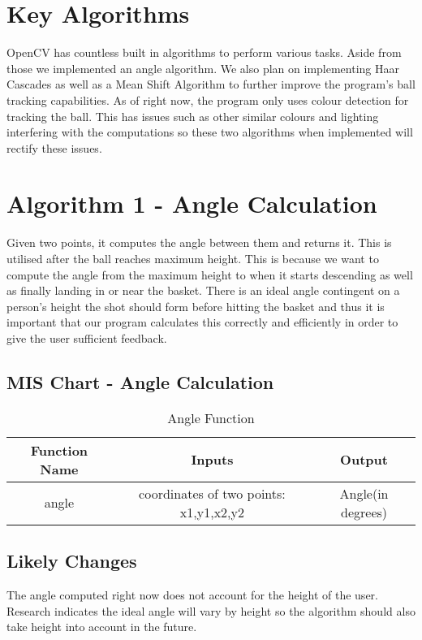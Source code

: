 \section{Key Algorithms}
OpenCV has countless built in algorithms to perform various tasks. Aside from those we implemented an angle algorithm. We also plan on implementing Haar Cascades as well as a Mean Shift Algorithm to further improve the program's ball tracking capabilities.  As of right now, the program only uses colour detection for tracking the ball. This has issues such as other similar colours and lighting interfering with the computations so these two algorithms when implemented will rectify these issues. 

\section{Algorithm 1 - Angle Calculation}
Given two points, it computes the angle between them and returns it. This is utilised after the ball reaches maximum height. This is because we want to compute the angle from the maximum height to when it starts descending as well as finally landing in or near the basket. There is an ideal angle contingent on a person's height the shot should form before hitting the basket and thus it is important that our program calculates this correctly and efficiently in order to give the user sufficient feedback. 

\subsection{MIS Chart - Angle Calculation}
\begin{table}[h!]
  \centering
  \caption{Angle Function}
  \label{tab:table10}
  \begin{tabular}{ccc}
    \toprule
    Function Name & Inputs & Output\\
    \midrule
    angle & coordinates of two points: x1,y1,x2,y2 & Angle(in degrees)\\
    \bottomrule
  \end{tabular}
\end{table}

\subsection{Likely Changes}
The angle computed right now does not account for the height of the user. Research indicates the ideal angle will vary by height so the algorithm should also take height into account in the future. 

